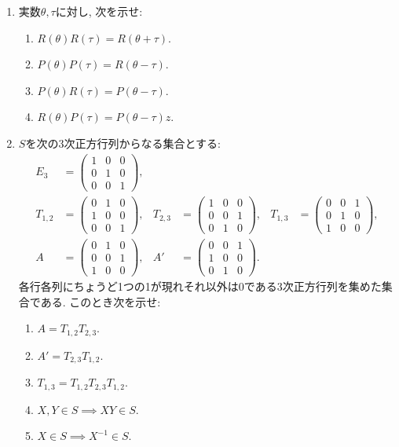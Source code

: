 \begin{enumerate}
\item
  実数$\theta, \tau$に対し, 次を示せ:
  \begin{enumerate}
  \item
    $R(\theta) R(\tau)=R(\theta+\tau)$.
  \item
    $P(\theta) P(\tau)=R(\theta-\tau)$.
  \item
    $P(\theta) R(\tau)=P(\theta-\tau)$.
  \item
    $R(\theta) P(\tau)=P(\theta-\tau)z$.
  \end{enumerate}
\item
  $S$を次の$3$次正方行列からなる集合とする:
  \begin{align*}
    E_3&=\begin{pmatrix}1&0&0\\0&1&0\\0&0&1\end{pmatrix},\\
    T_{1,2}&=\begin{pmatrix}0&1&0\\1&0&0\\0&0&1\end{pmatrix},&
    T_{2,3}&=\begin{pmatrix}1&0&0\\0&0&1\\0&1&0\end{pmatrix},&
    T_{1,3}&=\begin{pmatrix}0&0&1\\0&1&0\\1&0&0\end{pmatrix},\\
    A&=\begin{pmatrix}0&1&0\\0&0&1\\1&0&0\end{pmatrix},&
    A'&=\begin{pmatrix}0&0&1\\1&0&0\\0&1&0\end{pmatrix}.
  \end{align*}
  各行各列にちょうど1つの1が現れそれ以外は0である$3$次正方行列を集めた集合である.
  このとき次を示せ:
  \begin{enumerate}
    \item $A=T_{1,2}T_{2,3}$.
    \item $A'=T_{2,3}T_{1,2}$.
    \item $T_{1,3}=T_{1,2}T_{2,3}T_{1,2}$.
    \item $X, Y\in S \implies XY\in S$.
    \item $X\in S \implies X^{-1}\in S$.
  \end{enumerate}
\end{enumerate}

